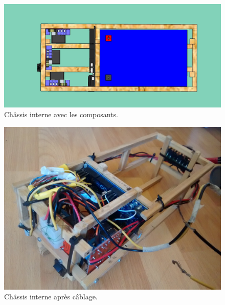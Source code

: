 \documentclass[11pt,a4paper]{article}
\begin{document}
        \begin{figure}[H]
          \centering
          \includegraphics[scale=0.4]{ROVInterieurHaut.jpg}
          \caption{Châssis interne avec les composants.}
          \label{figChassisComposants}
        \end{figure}
        \begin{figure}[H]
          \centering
          \includegraphics[scale=0.15]{ROVReelInterieurSansBatterie.jpg}
          \caption{Châssis interne après câblage.}
          \label{figROVReelInterieurSansBatterie}
        \end{figure}
\end{document}
